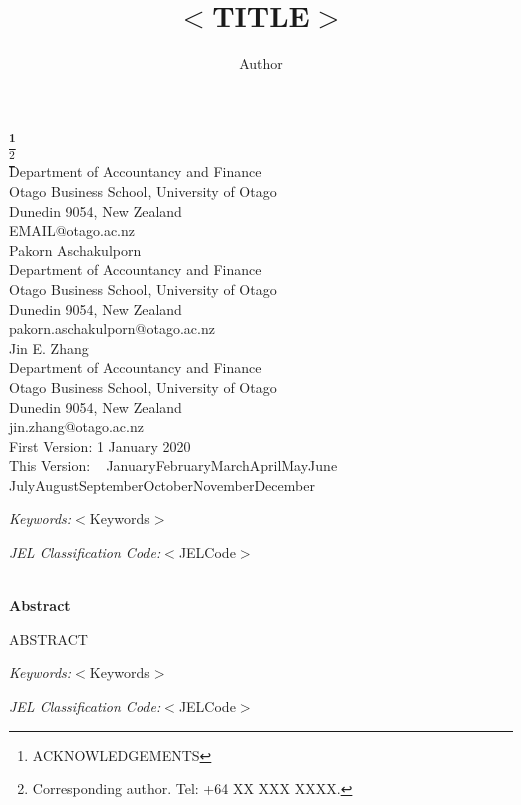 \documentclass[12pt, a4paper, oneside]{article}
\title{$<$TITLE$>$}
\author{Author}
\makeatletter
\newcommand{\Thanks}{
ACKNOWLEDGEMENTS}
\newcommand{\CorAuthor}{Corresponding author. Tel: +64 XX XXX XXXX.}
\newcommand{\email}{EMAIL@otago.ac.nz}
\newcommand{\FirstVersion}{1 January 2020}
\newcommand{\ThisVersion}{\today}
\newcommand{\Keywords}{$<$Keywords$>$}
\newcommand{\JELCode}{$<$JELCode$>$}
\let\title\@title
\let\author\@author
\def\today{%
  \the\day~%
  \ifcase\month\or%
  January\or February\or March\or April\or May\or June\or%
  July\or August\or September\or October\or November\or December\fi~%
  \number\year%
}
\newcommand{\footsym}[1]{\renewcommand{\thefootnote}{\fnsymbol{footnote}}\footnote{#1}\renewcommand{\thefootnote}{\arabic{footnote}}}
\newcommand\frontmatter{%
  \pagenumbering{roman}
  \setcounter{page}{0}
  \pagestyle{plain}
  \onehalfspacing
  }
\makeatother
\begin{document}
\frontmatter
{}
\begin{center}
\Large
\textbf{\title\footsym{\Thanks}} \\
\vspace{0.9cm}
\normalsize
\author\footsym{\CorAuthor} \\
Department of Accountancy and Finance \\
\vspace{-0.25em}
Otago Business School, University of Otago \\
\vspace{-0.25em}
Dunedin 9054, New Zealand \\
\vspace{-0.25em}
\email \\
\vspace{0.4cm}
Pakorn Aschakulporn \\
Department of Accountancy and Finance \\
\vspace{-0.25em}
Otago Business School, University of Otago \\
\vspace{-0.25em}
Dunedin 9054, New Zealand \\
\vspace{-0.25em}
pakorn.aschakulporn@otago.ac.nz \\
\vspace{0.4cm}
Jin E. Zhang \\
Department of Accountancy and Finance \\
\vspace{-0.25em}
Otago Business School, University of Otago \\
\vspace{-0.25em}
Dunedin 9054, New Zealand \\
\vspace{-0.25em}
jin.zhang@otago.ac.nz \\
\vspace{0.9cm}
First Version: \FirstVersion \\
This Version: \ThisVersion \\
\vspace{0.9cm}
\end{center}
\begin{flushleft}
\textit{Keywords:}\quad \Keywords

\textit{JEL Classification Code:}\quad \JELCode
\end{flushleft}
\raggedbottom
\pagebreak
\begin{center}
\Large
\textbf{\title} \\
\vspace{0.4cm}
\normalsize
\vspace{0.4cm}
\vspace{0.5cm}
\textbf{Abstract}
\end{center}
ABSTRACT
\vspace{0.5cm}
\begin{flushleft}
\textit{Keywords:}\quad \Keywords

\textit{JEL Classification Code:}\quad \JELCode
\end{flushleft}
\raggedbottom
\pagebreak
\end{document}
